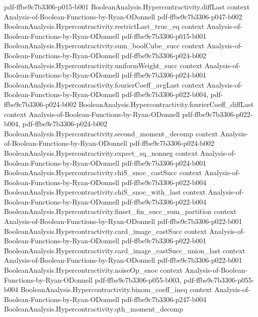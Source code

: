 \begin{theorem}
  {pdf-ffbe9c7b3306-p015-b001}
\proofstep
  {BooleanAnalysis.Hypercontractivity.diffLast}
  {context}
  {Analysis-of-Boolean-Functions-by-Ryan-ODonnell}
  {pdf-ffbe9c7b3306-p047-b002}
\proofstep
  {BooleanAnalysis.Hypercontractivity.restrictLast_true_eq}
  {context}
  {Analysis-of-Boolean-Functions-by-Ryan-ODonnell}
  {pdf-ffbe9c7b3306-p015-b001}
\proofstep
  {BooleanAnalysis.Hypercontractivity.sum_boolCube_succ}
  {context}
  {Analysis-of-Boolean-Functions-by-Ryan-ODonnell}
  {pdf-ffbe9c7b3306-p024-b002}
\proofstep
  {BooleanAnalysis.Hypercontractivity.uniformWeight_succ}
  {context}
  {Analysis-of-Boolean-Functions-by-Ryan-ODonnell}
  {pdf-ffbe9c7b3306-p024-b001}
\proofstep
  {BooleanAnalysis.Hypercontractivity.fourierCoeff_avgLast}
  {context}
  {Analysis-of-Boolean-Functions-by-Ryan-ODonnell}
  {pdf-ffbe9c7b3306-p022-b004,
    pdf-ffbe9c7b3306-p024-b002}
\proofstep
  {BooleanAnalysis.Hypercontractivity.fourierCoeff_diffLast}
  {context}
  {Analysis-of-Boolean-Functions-by-Ryan-ODonnell}
  {pdf-ffbe9c7b3306-p022-b004,
    pdf-ffbe9c7b3306-p024-b002}
\proofstep
  {BooleanAnalysis.Hypercontractivity.second_moment_decomp}
  {context}
  {Analysis-of-Boolean-Functions-by-Ryan-ODonnell}
  {pdf-ffbe9c7b3306-p024-b002}
\proofstep
  {BooleanAnalysis.Hypercontractivity.expect_sq_nonneg}
  {context}
  {Analysis-of-Boolean-Functions-by-Ryan-ODonnell}
  {pdf-ffbe9c7b3306-p024-b001}
\proofstep
  {BooleanAnalysis.Hypercontractivity.chiS_snoc_castSucc}
  {context}
  {Analysis-of-Boolean-Functions-by-Ryan-ODonnell}
  {pdf-ffbe9c7b3306-p022-b004}
\proofstep
  {BooleanAnalysis.Hypercontractivity.chiS_snoc_with_last}
  {context}
  {Analysis-of-Boolean-Functions-by-Ryan-ODonnell}
  {pdf-ffbe9c7b3306-p022-b004}
\proofstep
  {BooleanAnalysis.Hypercontractivity.finset_fin_succ_sum_partition}
  {context}
  {Analysis-of-Boolean-Functions-by-Ryan-ODonnell}
  {pdf-ffbe9c7b3306-p022-b001}
\proofstep
  {BooleanAnalysis.Hypercontractivity.card_image_castSucc}
  {context}
  {Analysis-of-Boolean-Functions-by-Ryan-ODonnell}
  {pdf-ffbe9c7b3306-p022-b001}
\proofstep
  {BooleanAnalysis.Hypercontractivity.card_image_castSucc_union_last}
  {context}
  {Analysis-of-Boolean-Functions-by-Ryan-ODonnell}
  {pdf-ffbe9c7b3306-p022-b001}
\proofstep
  {BooleanAnalysis.Hypercontractivity.noiseOp_snoc}
  {context}
  {Analysis-of-Boolean-Functions-by-Ryan-ODonnell}
  {pdf-ffbe9c7b3306-p055-b003,
    pdf-ffbe9c7b3306-p055-b004}
\proofstep
  {BooleanAnalysis.Hypercontractivity.binom_coeff_ineq}
  {context}
  {Analysis-of-Boolean-Functions-by-Ryan-ODonnell}
  {pdf-ffbe9c7b3306-p247-b004}
\proofstep
  {BooleanAnalysis.Hypercontractivity.qth_moment_decomp}

\end{theorem}
